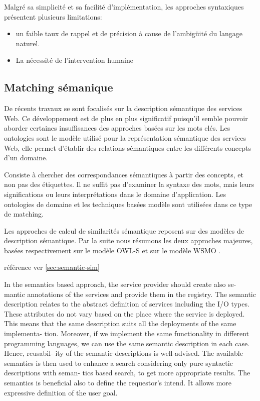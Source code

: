   Malgré sa simplicité et sa facilité d'implémentation, les approches
  syntaxiques présentent plusieurs limitations:

  \begin{itemize}
  \item un faible taux de rappel et de précision à cause de
    l'ambigüité du langage naturel.
  \item La nécessité de l'intervention humaine
  \end{itemize}

  \subsection{Matching sémanique}
  \label{sec:matching-semanique}

  {\color{blue} De récents travaux se sont focalisés sur la
    description sémantique des services Web. Ce développement est de
    plus en plus significatif puisqu'il semble pouvoir aborder
    certaines insuffisances des approches basées sur les mots
    clés. Les ontologies sont le modèle utilisé pour la représentation
    sémantique des services Web, elle permet d’établir des relations
    sémantiques entre les différents concepts d'un
    domaine. \cite{chelbabi2012decouverte}

    Consiste à chercher des correspondances sémantiques à partir des
    concepts, et non pas des étiquettes. Il ne suffit pas d'examiner
    la syntaxe des mots, mais leurs significations ou leurs
    interprétations dans le domaine d'application. Les ontologies de
    domaine et les techniques basées modèle sont utilisées dans ce
    type de matching.

    Les approches de calcul de similarités sémantique reposent sur des
    modèles de description sémantique. Par la suite nous résumons
    les deux approches majeures, basées respectivement sur le modèle
    \textsc{OWL-S} et sur le modèle \textsc{WSMO} \cite{elie2010}.

    référence ver \ref{sec:semantic-sim}
  }

  {\color{red} In the semantics based approach, the service provider
    should create also se- mantic annotations of the services and
    provide them in the registry. The semantic description relates to
    the abstract definition of services including the I/O types.
    These attributes do not vary based on the place where the service
    is deployed. This means that the same description suits all the
    deployments of the same implementa- tion. Moreover, if we
    implement the same functionality in different programming
    languages, we can use the same semantic description in each
    case. Hence, reusabil- ity of the semantic descriptions is
    well-advised. The available semantics is then used to enhance a
    search considering only pure syntactic descriptions with seman-
    tics based search, to get more appropriate results. The semantics
    is beneficial also to define the requestor’s intend. It allows
    more expressive definition of the user
    goal. \cite{bartalos2011effective} }

